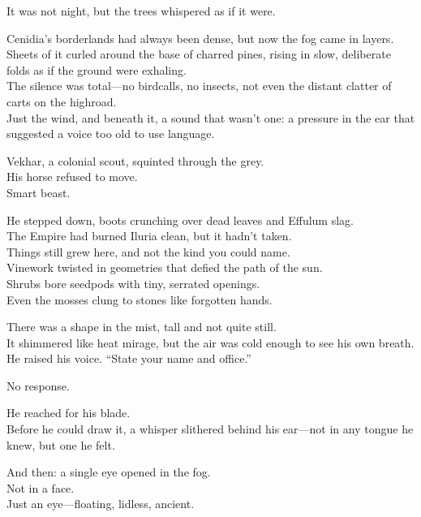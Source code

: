 \documentclass[12pt]{article}
\begin{document}
It was not night, but the trees whispered as if it were.

Cenidia’s borderlands had always been dense, but now the fog came in layers.\\
Sheets of it curled around the base of charred pines, rising in slow, deliberate folds as if the ground were exhaling.\\
The silence was total—no birdcalls, no insects, not even the distant clatter of carts on the highroad.\\
Just the wind, and beneath it, a sound that wasn’t one: a pressure in the ear that suggested a voice too old to use language.

\vspace{1em}

Vekhar, a colonial scout, squinted through the grey.\\
His horse refused to move.\\
Smart beast.

He stepped down, boots crunching over dead leaves and Effulum slag.\\
The Empire had burned Iluria clean, but it hadn’t taken.\\
Things still grew here, and not the kind you could name.\\
Vinework twisted in geometries that defied the path of the sun.\\
Shrubs bore seedpods with tiny, serrated openings.\\
Even the mosses clung to stones like forgotten hands.

\vspace{1em}

There was a shape in the mist, tall and not quite still.\\
It shimmered like heat mirage, but the air was cold enough to see his own breath.\\
He raised his voice. “State your name and office.”

No response.

\vspace{1em}

He reached for his blade.\\
Before he could draw it, a whisper slithered behind his ear—not in any tongue he knew, but one he felt.

\vspace{1em}

And then: a single eye opened in the fog.\\
Not in a face.\\
Just an eye—floating, lidless, ancient.
\end{document}
